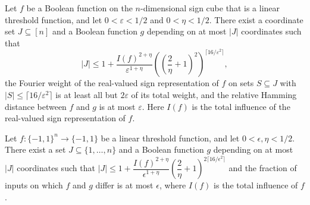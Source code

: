 \begin{theorem}
\label{FABL.ltf_improvedFriedgut_junta}
\leanok
{}
Let $f$ be a Boolean function on the $n$-dimensional sign cube that is a linear
threshold function, and let $0<\varepsilon<1/2$ and $0<\eta<1/2$. There exist a
coordinate set $J\subseteq[n]$ and a Boolean function $g$ depending on at most $|J|$
coordinates such that
\[|J|\le 1+\frac{I(f)^{2+\eta}}{\varepsilon^{1+\eta}}\left(\left(\frac{2}{\eta}+1\right)^2\right)^{\lceil16/\varepsilon^2\rceil},\]
the Fourier weight of the real-valued sign representation of $f$ on sets $S\subseteq J$
with $|S|\le\lceil16/\varepsilon^2\rceil$ is at least all but $2\varepsilon$ of its
total weight, and the relative Hamming distance between $f$ and $g$ is at most
$\varepsilon$. Here $I(f)$ is the total influence of the real-valued sign representation
of $f$.
\end{theorem}

\begin{theorem}
\label{FABL.corollary9_31_ltf_close_to_junta}
\leanok
{}
Let $f:\{-1,1\}^n\to\{-1,1\}$ be a linear threshold function, and let
$0<\epsilon,\eta<1/2$. There exist a set $J\subseteq\{1,\ldots,n\}$ and a Boolean
function $g$ depending on at most $|J|$ coordinates such that $|J|\le
1+\dfrac{I(f)^{2+\eta}}{\epsilon^{1+\eta}}\left(\dfrac{2}{\eta}+1\right)^{2\lceil16/\epsilon^2\rceil}$
and the fraction of inputs on which $f$ and $g$ differ is at most $\epsilon$, where
$I(f)$ is the total influence of $f$.
\end{theorem}
